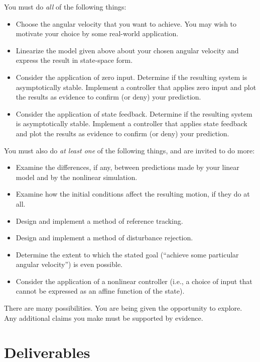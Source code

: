 \documentclass[12pt]{article}
\begin{document}
You must do \emph{all} of the following things:
\begin{itemize}

\item Choose the angular velocity that you want to achieve. You may wish to motivate your choice by some real-world application.
\item Linearize the model given above about your chosen angular velocity and express the result in state-space form.
\item Consider the application of zero input. Determine if the resulting system is asymptotically stable. Implement a controller that applies zero input and plot the results as evidence to confirm (or deny) your prediction.
\item Consider the application of state feedback. Determine if the resulting system is asymptotically stable. Implement a controller that applies state feedback and plot the results as evidence to confirm (or deny) your prediction.

\end{itemize}
You must also do \emph{at least one} of the following things, and are invited to do more:
\begin{itemize}

\item Examine the differences, if any, between predictions made by your linear model and by the nonlinear simulation.
\item Examine how the initial conditions affect the resulting motion, if they do at all.
\item Design and implement a method of reference tracking.
\item Design and implement a method of disturbance rejection.
\item Determine the extent to which the stated goal (``achieve some particular angular velocity'') is even possible.
\item Consider the application of a nonlinear controller (i.e., a choice of input that cannot be expressed as an affine function of the state).

\end{itemize}
There are many possibilities. You are being given the opportunity to explore. Any additional claims you make must be supported by evidence.

\section{Deliverables}
\end{document}
